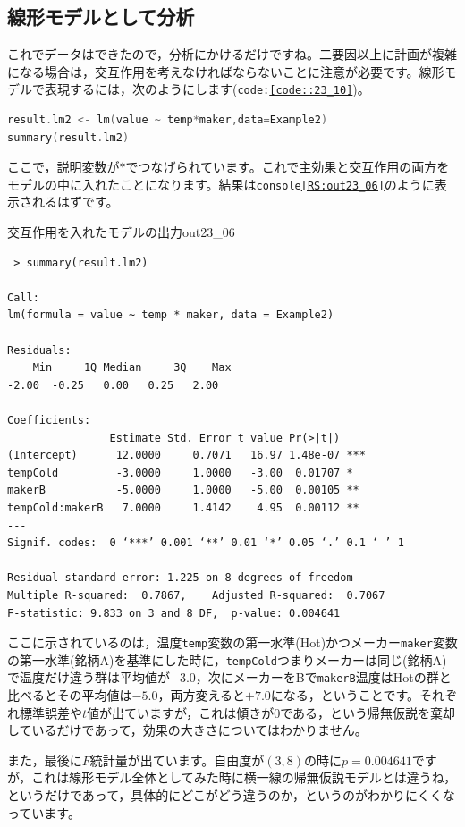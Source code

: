 \documentclass{ltjsarticle}
\begin{document}
\subsection{線形モデルとして分析}
これでデータはできたので，分析にかけるだけですね。二要因以上に計画が複雑になる場合は，交互作用を考えなければならないことに注意が必要です。線形モデルで表現するには，次のようにします(\texttt{code:\ref{code::23_10}})。
\begin{lstlisting}[language=c++,label={code::23_10},caption={線形モデルとして実行}]
result.lm2 <- lm(value ~ temp*maker,data=Example2)
summary(result.lm2)
\end{lstlisting}
ここで，説明変数が$\ast$でつなげられています。これで主効果と交互作用の両方をモデルの中に入れたことになります。結果は\texttt{console\ref{RS:out23_06}}のように表示されるはずです。

\begin{Rscreen}{交互作用を入れたモデルの出力}{out23_06}
\begin{verbatim}
 > summary(result.lm2)

Call:
lm(formula = value ~ temp * maker, data = Example2)
 
Residuals:
    Min     1Q Median     3Q    Max 
-2.00  -0.25   0.00   0.25   2.00 

Coefficients:
                Estimate Std. Error t value Pr(>|t|)    
(Intercept)      12.0000     0.7071   16.97 1.48e-07 ***
tempCold         -3.0000     1.0000   -3.00  0.01707 *  
makerB           -5.0000     1.0000   -5.00  0.00105 ** 
tempCold:makerB   7.0000     1.4142    4.95  0.00112 ** 
---
Signif. codes:  0 ‘***’ 0.001 ‘**’ 0.01 ‘*’ 0.05 ‘.’ 0.1 ‘ ’ 1

Residual standard error: 1.225 on 8 degrees of freedom
Multiple R-squared:  0.7867,	Adjusted R-squared:  0.7067 
F-statistic: 9.833 on 3 and 8 DF,  p-value: 0.004641
\end{verbatim}
\end{Rscreen}
ここに示されているのは，温度\texttt{temp}変数の第一水準(Hot)かつメーカー\texttt{maker}変数の第一水準(銘柄A)を基準にした時に，\texttt{tempCold}つまりメーカーは同じ(銘柄A)で温度だけ違う群は平均値が$-3.0$，次にメーカーをBで\texttt{makerB}温度はHotの群と比べるとその平均値は$-5.0$，両方変えると$+7.0$になる，ということです。それぞれ標準誤差や$t$値が出ていますが，これは傾きが0である，という帰無仮説を棄却しているだけであって，効果の大きさについてはわかりません。

また，最後に$F$統計量が出ています。自由度が$(3,8)$の時に$p=0.004641$ですが，これは線形モデル全体としてみた時に横一線の帰無仮説モデルとは違うね，というだけであって，具体的にどこがどう違うのか，というのがわかりにくくなっています。
\end{document}
